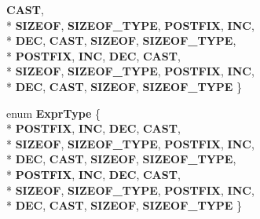 \begin{DoxyCompactItemize}
{\bfseries C\-A\-S\-T}, 
\\*
{\bfseries S\-I\-Z\-E\-O\-F}, 
{\bfseries S\-I\-Z\-E\-O\-F\-\_\-\-T\-Y\-P\-E}, 
{\bfseries P\-O\-S\-T\-F\-I\-X}, 
{\bfseries I\-N\-C}, 
\\*
{\bfseries D\-E\-C}, 
{\bfseries C\-A\-S\-T}, 
{\bfseries S\-I\-Z\-E\-O\-F}, 
{\bfseries S\-I\-Z\-E\-O\-F\-\_\-\-T\-Y\-P\-E}, 
\\*
{\bfseries P\-O\-S\-T\-F\-I\-X}, 
{\bfseries I\-N\-C}, 
{\bfseries D\-E\-C}, 
{\bfseries C\-A\-S\-T}, 
\\*
{\bfseries S\-I\-Z\-E\-O\-F}, 
{\bfseries S\-I\-Z\-E\-O\-F\-\_\-\-T\-Y\-P\-E}, 
{\bfseries P\-O\-S\-T\-F\-I\-X}, 
{\bfseries I\-N\-C}, 
\\*
{\bfseries D\-E\-C}, 
{\bfseries C\-A\-S\-T}, 
{\bfseries S\-I\-Z\-E\-O\-F}, 
{\bfseries S\-I\-Z\-E\-O\-F\-\_\-\-T\-Y\-P\-E}
 \}
\item 
enum {\bfseries Expr\-Type} \{ \\*
{\bfseries P\-O\-S\-T\-F\-I\-X}, 
{\bfseries I\-N\-C}, 
{\bfseries D\-E\-C}, 
{\bfseries C\-A\-S\-T}, 
\\*
{\bfseries S\-I\-Z\-E\-O\-F}, 
{\bfseries S\-I\-Z\-E\-O\-F\-\_\-\-T\-Y\-P\-E}, 
{\bfseries P\-O\-S\-T\-F\-I\-X}, 
{\bfseries I\-N\-C}, 
\\*
{\bfseries D\-E\-C}, 
{\bfseries C\-A\-S\-T}, 
{\bfseries S\-I\-Z\-E\-O\-F}, 
{\bfseries S\-I\-Z\-E\-O\-F\-\_\-\-T\-Y\-P\-E}, 
\\*
{\bfseries P\-O\-S\-T\-F\-I\-X}, 
{\bfseries I\-N\-C}, 
{\bfseries D\-E\-C}, 
{\bfseries C\-A\-S\-T}, 
\\*
{\bfseries S\-I\-Z\-E\-O\-F}, 
{\bfseries S\-I\-Z\-E\-O\-F\-\_\-\-T\-Y\-P\-E}, 
{\bfseries P\-O\-S\-T\-F\-I\-X}, 
{\bfseries I\-N\-C}, 
\\*
{\bfseries D\-E\-C}, 
{\bfseries C\-A\-S\-T}, 
{\bfseries S\-I\-Z\-E\-O\-F}, 
{\bfseries S\-I\-Z\-E\-O\-F\-\_\-\-T\-Y\-P\-E}
 \}
\end{DoxyCompactItemize}
